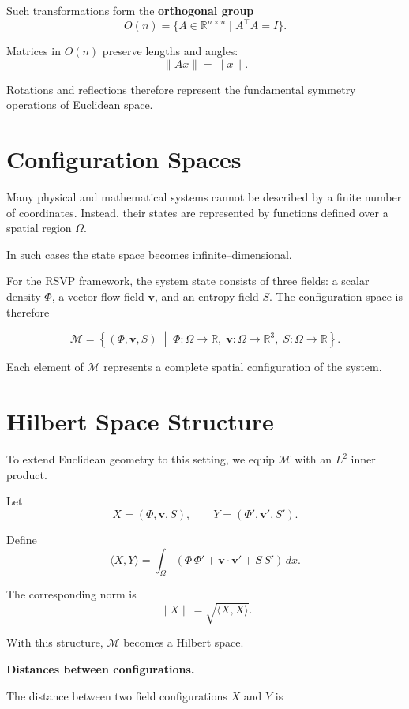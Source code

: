 \documentclass[11pt, openany]{book}
\theoremstyle{plain}
\theoremstyle{definition}
\theoremstyle{remark}
\begin{document}
Such transformations form the \textbf{orthogonal group}
\[
O(n)=\{A\in\mathbb{R}^{n\times n}\mid A^\top A=I\}.
\]

Matrices in $O(n)$ preserve lengths and angles:
\[
\|Ax\|=\|x\|.
\]

Rotations and reflections therefore represent the fundamental symmetry
operations of Euclidean space.

\section{Configuration Spaces}

Many physical and mathematical systems cannot be described by a finite
number of coordinates.  Instead, their states are represented by
functions defined over a spatial region $\Omega$.

In such cases the state space becomes infinite–dimensional.

For the RSVP framework, the system state consists of three fields:
a scalar density $\Phi$, a vector flow field $\mathbf{v}$, and an
entropy field $S$.  The configuration space is therefore

\[
\mathcal{M}=
\left\{
(\Phi,\mathbf{v},S)
\;\middle|\;
\Phi:\Omega\to\mathbb{R},
\;
\mathbf{v}:\Omega\to\mathbb{R}^3,
\;
S:\Omega\to\mathbb{R}
\right\}.
\]

Each element of $\mathcal{M}$ represents a complete spatial
configuration of the system.

\section{Hilbert Space Structure}

To extend Euclidean geometry to this setting, we equip $\mathcal{M}$ with
an $L^2$ inner product.

Let
\[
X=(\Phi,\mathbf{v},S),
\qquad
Y=(\Phi',\mathbf{v}',S').
\]

Define
\[
\langle X,Y\rangle
=
\int_{\Omega}
\left(
\Phi\,\Phi'
+
\mathbf{v}\cdot\mathbf{v}'
+
S\,S'
\right)\,dx .
\]

The corresponding norm is
\[
\|X\|
=
\sqrt{\langle X,X\rangle}.
\]

With this structure, $\mathcal{M}$ becomes a Hilbert space.

\medskip

\textbf{Distances between configurations.}

The distance between two field configurations $X$ and $Y$ is
\end{document}

